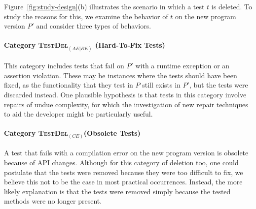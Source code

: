 \documentclass[conference]{IEEEtran}
\newcommand{\lang}[1]{\texttt{\small #1}}
\newcommand{\subject}[1]{\texttt{\small #1}}
\newcommand{\mt}{\mathit}
\newcommand{\catdelaere}{\textsc{TestDel}$_\mt{(AE|RE)}$}
\newcommand{\catdelce}{\textsc{TestDel}$_\mt{(CE)}$}
\begin{document}
Figure~\ref{fig:study-design}(b) illustrates the scenario in which a
test $t$ is deleted. To study the reasons for this, we examine the
behavior of $t$ on the new program version $P'$ and consider three
types of behaviors.

\paragraph{Category \catdelaere{} (Hard-To-Fix Tests)}
\label{sec:category-delaere}


This category includes tests that fail on $P'$ with a runtime
exception or an assertion violation. These may be instances where the
tests should have been fixed, as the functionality that they test in
$P$ still exists in $P'$, but the tests were discarded instead. One
plausible hypothesis is that tests in this category involve repairs of
undue complexity, for which the investigation of new repair techniques
to aid the developer might be particularly useful.

\paragraph{Category \catdelce (Obsolete Tests)}
\label{sec:category-delce}

A test that fails with a compilation error on the new program version
is obsolete because of API changes.
%
%
%
Although for this category of deletion too, one could postulate that
the tests were removed because they were too difficult to fix, we
believe this not to be the case in most practical occurrences.
Instead, the more likely explanation is that the tests were removed
simply because the tested methods were no longer present.
\end{document}
